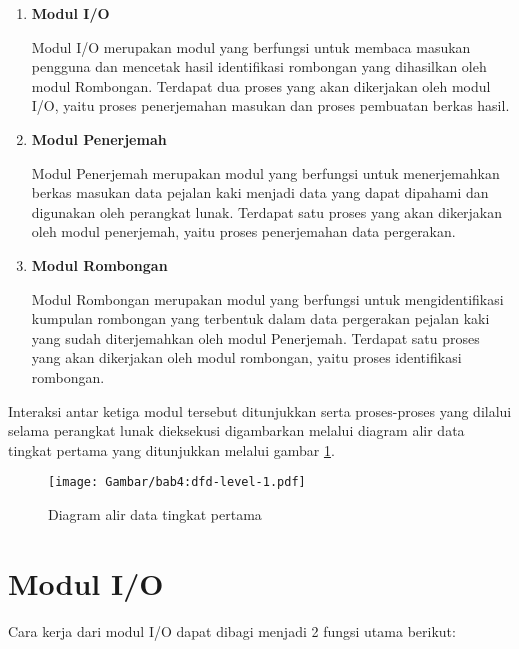 \begin{enumerate}
    \item \textbf{Modul I/O}
    
    Modul I/O merupakan modul yang berfungsi untuk membaca masukan pengguna dan mencetak hasil identifikasi rombongan yang dihasilkan oleh modul Rombongan. Terdapat dua proses yang akan dikerjakan oleh modul I/O, yaitu proses penerjemahan masukan dan proses pembuatan berkas hasil.
    
    \item \textbf{Modul Penerjemah}
    
    Modul Penerjemah merupakan modul yang berfungsi untuk menerjemahkan berkas masukan data pejalan kaki menjadi data yang dapat dipahami dan digunakan oleh perangkat lunak. Terdapat satu proses yang akan dikerjakan oleh modul penerjemah, yaitu proses penerjemahan data pergerakan.
    
    \item \textbf{Modul Rombongan}
    
    Modul Rombongan merupakan modul yang berfungsi untuk mengidentifikasi kumpulan rombongan yang terbentuk dalam data pergerakan pejalan kaki yang sudah diterjemahkan oleh modul Penerjemah. Terdapat satu proses yang akan dikerjakan oleh modul rombongan, yaitu proses identifikasi rombongan.
\end{enumerate}

Interaksi antar ketiga modul tersebut ditunjukkan serta proses-proses yang dilalui selama perangkat lunak dieksekusi digambarkan melalui diagram alir data tingkat pertama yang ditunjukkan melalui gambar \ref{bab4:dfd-level-1}.

\begin{figure}[t!]
    \centering
    \texttt{[image: Gambar/bab4:dfd-level-1.pdf]}
    \caption{Diagram alir data tingkat pertama}
    \label{bab4:dfd-level-1}
\end{figure}

\section{Modul I/O}
\label{sec:des-io}

Cara kerja dari modul I/O dapat dibagi menjadi 2 fungsi utama berikut:

